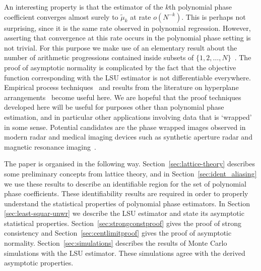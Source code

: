 \documentclass[aap]{imsart}
\begin{document}
An interesting property is that the estimator of the $k$th polynomial phase coefficient converges almost surely to $\tilde{\mu}_k$ at rate $o(N^{-k})$.  This is perhaps not surprising, since it is the same rate observed in polynomial regression.  However, asserting that convergence at this rate occurs in the polynomial phase setting is not trivial.  For this purpose we make use of an elementary result about the number of arithmetic progressions contained inside subsets of $\{1,2,\dots,N\}$~\cite{Erdos_on_some_sequence_of_integers1936,Szemeredi_setint_no_k_arth1975,Gowers_new_proof2001}.  %
The proof of asymptotic normality is complicated by the fact that the objective function corresponding with the LSU estimator is not differentiable everywhere.  Empirical process techniques~\cite{Pollard_new_ways_clts_1986,Pollard_asymp_empi_proc_1989,van2009empirical,Dudley_unif_central_lim_th_1999} and results from the literature on hyperplane arrangements~\cite{Chazelle_discrepency_method_2000,Matousek_lect_disc_geom_2002} become useful here.  We are hopeful that the proof techniques developed here will be useful for purposes other than polynomial phase estimation, and in particular other applications involving data that is `wrapped' in some sense.  Potential candidates are the phase wrapped images observed in modern radar and medical imaging devices such as synthetic aperture radar and magnetic resonance imaging~\cite{Nico_phaseunwrappingSAR_2000,Friedlander_PD_phaseunwrapping_1996}.

The paper is organised in the following way. Section~\ref{sec:lattice-theory} describes some preliminary concepts from lattice theory, and in Section~\ref{sec:ident_aliasing} we use these results to describe an identifiable region for the set of polynomial phase coefficients.  These identifiability results are required in order to properly understand the statistical properties of polynomial phase estimators. In Section \ref{sec:least-squar-unwr} we describe the LSU estimator and state its asymptotic statistical properties.  Section~\ref{sec:strongconstproof} gives the proof of strong consistency and Section~\ref{sec:centlimitproof} gives the proof of asymptotic normality. 
Section~\ref{sec:simulations} describes the results of Monte Carlo simulations with the LSU estimator.  These simulations agree with the derived asymptotic properties. 
\end{document}
